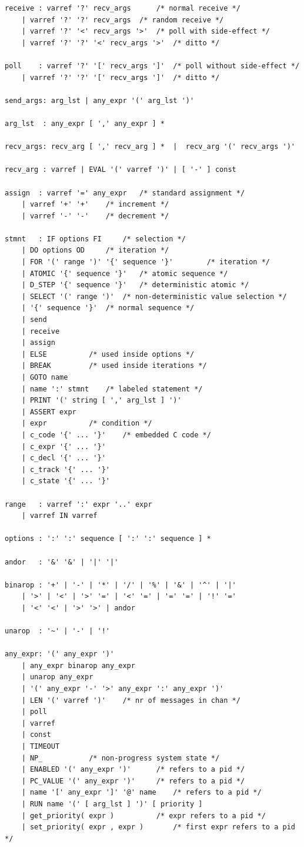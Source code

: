 \documentclass[12pt, twoside]{report}
\begin{document}
\begin{verbatim}
receive : varref '?' recv_args		/* normal receive */
	| varref '?' '?' recv_args	/* random receive */
	| varref '?' '<' recv_args '>'	/* poll with side-effect */
	| varref '?' '?' '<' recv_args '>'	/* ditto */

poll    : varref '?' '[' recv_args ']'	/* poll without side-effect */
	| varref '?' '?' '[' recv_args ']'	/* ditto */

send_args: arg_lst | any_expr '(' arg_lst ')'

arg_lst  : any_expr [ ',' any_expr ] *

recv_args: recv_arg [ ',' recv_arg ] *  |  recv_arg '(' recv_args ')'

recv_arg : varref | EVAL '(' varref ')' | [ '-' ] const

assign  : varref '=' any_expr	/* standard assignment */
	| varref '+' '+'	/* increment */
	| varref '-' '-'	/* decrement */

stmnt	: IF options FI		/* selection */
	| DO options OD		/* iteration */
	| FOR '(' range ')' '{' sequence '}'		/* iteration */
	| ATOMIC '{' sequence '}'	/* atomic sequence */
	| D_STEP '{' sequence '}'	/* deterministic atomic */
	| SELECT '(' range ')'	/* non-deterministic value selection */
	| '{' sequence '}'	/* normal sequence */
	| send
	| receive
	| assign
	| ELSE			/* used inside options */
	| BREAK			/* used inside iterations */
	| GOTO name
	| name ':' stmnt	/* labeled statement */
	| PRINT '(' string [ ',' arg_lst ] ')'
	| ASSERT expr
	| expr			/* condition */
	| c_code '{' ... '}'	/* embedded C code */
	| c_expr '{' ... '}'
	| c_decl '{' ... '}'
	| c_track '{' ... '}'
	| c_state '{' ... '}'

range	: varref ':' expr '..' expr
	| varref IN varref

options : ':' ':' sequence [ ':' ':' sequence ] *

andor	: '&' '&' | '|' '|'

binarop	: '+' | '-' | '*' | '/' | '%' | '&' | '^' | '|'
	| '>' | '<' | '>' '=' | '<' '=' | '=' '=' | '!' '='
	| '<' '<' | '>' '>' | andor

unarop	: '~' | '-' | '!'

any_expr: '(' any_expr ')'
	| any_expr binarop any_expr
	| unarop any_expr
	| '(' any_expr '-' '>' any_expr ':' any_expr ')'
	| LEN '(' varref ')'	/* nr of messages in chan */
	| poll
	| varref
	| const
	| TIMEOUT
	| NP_			/* non-progress system state */
	| ENABLED '(' any_expr ')'		/* refers to a pid */
	| PC_VALUE '(' any_expr ')'		/* refers to a pid */
	| name '[' any_expr ']' '@' name	/* refers to a pid */
	| RUN name '(' [ arg_lst ] ')' [ priority ]
	| get_priority( expr )			/* expr refers to a pid */
	| set_priority( expr , expr )		/* first expr refers to a pid */


\end{verbatim}
\end{document}
